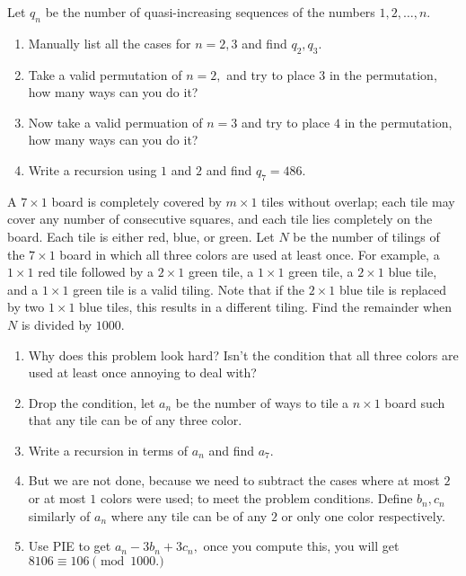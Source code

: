 \documentclass[11pt][mast]{lucky}
\begin{document}
\begin{walk}
Let $q_n$ be the number of quasi-increasing sequences of the numbers $1, 2, \ldots, n.$

\begin{enumerate}
\item Manually list all the cases for $n=2, 3$ and find $q_2, q_3$.
\item Take a valid permutation of $n = 2,$ and try to place $3$ in the permutation, how many ways can you do it?
\item Now take  a valid permuation of $n= 3$ and try to place $4$ in the permutation, how many ways can you do it?
\item  Write a recursion using $1$ and $2$ and find $q_7=486.$
\end{enumerate}
\end{walk}


\begin{exam}[AIME 2013 II/9]
A $7 \times 1$ board is completely covered by $m \times 1$ tiles without overlap; each tile may cover any number of consecutive squares, and each tile lies completely on the board. Each tile is either red, blue, or green. Let $N$ be the number of tilings of the $7 \times 1$ board in which all three colors are used at least once. For example, a $1 \times 1$ red tile followed by a $2 \times 1$ green tile, a $1 \times 1$ green tile, a $2 \times 1$ blue tile, and a $1 \times 1$ green tile is a valid tiling. Note that if the $2 \times 1$ blue tile is replaced by two $1 \times 1$ blue tiles, this results in a different tiling. Find the remainder when $N$ is divided by $1000$.
\end{exam}


\begin{walk}
\begin{enumerate}
\item Why does this problem look hard? Isn't the condition that all three colors are used at least once annoying to deal with?
\item Drop the condition, let $a_n$ be the number of ways to tile a $n \times 1$ board such that any tile can be of any three color.
\item Write a recursion in terms of $a_n$ and find $a_7.$
\item But we are not done, because we need to subtract the cases where at most $2$ or at most $1$ colors were used; to meet the problem conditions.
Define $b_n, c_n$ similarly of $a_n$ where any tile can be of any $2$ or only one color respectively. 
\item Use PIE to get $a_n - 3b_n + 3c_n,$ once you compute this, you will get $8106 \equiv 106 \pmod{1000.}$
\end{enumerate}
\end{walk}
\end{document}
